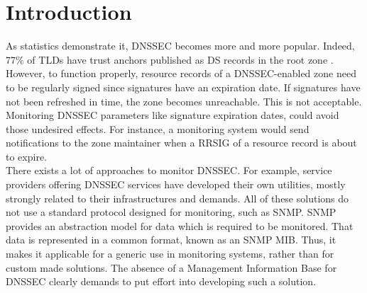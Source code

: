 \section{Introduction}
\label{chap:introduction}
As statistics demonstrate it, DNSSEC becomes more and more popular. Indeed, 77\% of TLDs have trust anchors published as DS records in the root zone \cite{stats}. However, to function properly, resource records of a DNSSEC-enabled zone need to be regularly signed since signatures have an expiration date. If signatures have not been refreshed in time, the zone becomes unreachable. This is not acceptable.
\\
Monitoring DNSSEC parameters like signature expiration dates, could avoid those undesired effects. For instance, a monitoring system would send notifications to the zone maintainer when a RRSIG of a resource record is about to expire.
\\
There exists a lot of approaches to monitor DNSSEC. For example, service providers offering DNSSEC services have developed their own utilities, mostly strongly related to their infrastructures and demands. All of these solutions do not use a standard protocol designed for monitoring, such as SNMP. SNMP provides an abstraction model for data which is required to be monitored. That data is represented in a common format, known as an SNMP MIB. Thus, it makes it applicable for a generic use in monitoring systems, rather than for custom made solutions. The absence of a Management Information Base for DNSSEC clearly demands to put effort into developing such a solution.

